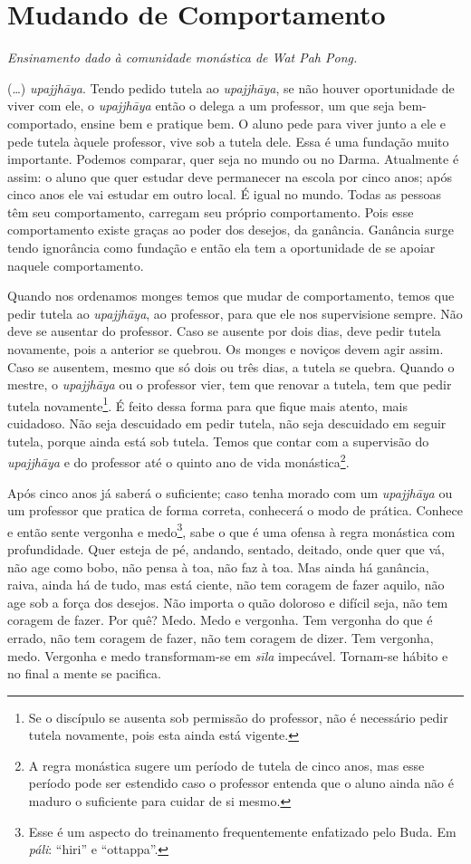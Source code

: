 
\chapter{Mudando de Comportamento}

{\itshape
Ensinamento dado à comunidade monástica de Wat Pah Pong.}

(…) \textit{upajjh\=aya}. Tendo pedido tutela ao
\textit{upajjh\=aya}, se não houver oportunidade de viver com ele, o
\textit{upajjh\=aya }então o delega a um professor, um que seja
bem-comportado, ensine bem e pratique bem. O aluno pede para viver
junto a ele e pede tutela àquele professor, vive sob a tutela dele.
Essa é uma fundação muito importante. Podemos comparar, quer seja no
mundo ou no Darma. Atualmente é assim: o aluno que quer estudar deve
permanecer na escola por cinco anos; após cinco anos ele vai estudar em
outro local. É igual no mundo. Todas as pessoas têm seu comportamento,
carregam seu próprio comportamento. Pois esse comportamento existe
graças ao poder dos desejos, da ganância. Ganância surge tendo
ignorância como fundação e então ela tem a oportunidade de se apoiar
naquele comportamento. 

Quando nos ordenamos monges temos que mudar de comportamento, temos
que pedir tutela ao \textit{upajjh\=aya}, ao professor, para que ele
nos supervisione sempre. Não deve se ausentar do professor. Caso se
ausente por dois dias, deve pedir tutela novamente, pois a anterior se
quebrou. Os monges e noviços devem agir assim. Caso se ausentem, mesmo
que só dois ou três dias, a tutela se quebra. Quando o mestre, o
\textit{upajjh\=aya} ou o professor vier, tem que renovar a tutela, tem
que pedir tutela novamente\footnote{Se o discípulo se ausenta sob
permissão do professor, não é necessário pedir tutela novamente, pois
esta ainda está vigente.}. É feito dessa forma para que fique mais
atento, mais cuidadoso. Não seja descuidado em pedir tutela, não seja
descuidado em seguir tutela, porque ainda está sob tutela. Temos que
contar com a supervisão do \textit{upajjh\=aya }e do professor até o
quinto ano de vida monástica\footnote{A regra monástica sugere um
período de tutela de cinco anos, mas esse período pode ser estendido
caso o professor entenda que o aluno ainda não é maduro o suficiente
para cuidar de si mesmo.}. 

Após cinco anos já saberá o suficiente; caso tenha morado com um
\textit{upajjh\=aya} ou um professor que pratica de forma correta,
conhecerá o modo de prática. Conhece e então sente vergonha e
medo\footnote{Esse é um aspecto do treinamento frequentemente
enfatizado pelo Buda. Em \textit{páli}: “hiri” e “ottappa”.}, sabe o
que é uma ofensa à regra monástica com profundidade. Quer esteja de pé,
andando, sentado, deitado, onde quer que vá, não age como bobo, não
pensa à toa, não faz à toa. Mas ainda há ganância, raiva, ainda há de
tudo, mas está ciente, não tem coragem de fazer aquilo, não age sob a
força dos desejos. Não importa o quão doloroso e difícil seja, não tem
coragem de fazer. Por quê? Medo. Medo e vergonha. Tem vergonha do que é
errado, não tem coragem de fazer, não tem coragem de dizer. Tem
vergonha, medo. Vergonha e medo transformam-se em \textit{sīla}
impecável. Tornam-se hábito e no final a mente se pacifica. 

